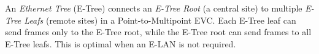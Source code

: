 \documentclass[12pt]{article}
\begin{document}
	An \textit{Ethernet Tree} (E-Tree) connects an \textit{E-Tree Root} (a central site) to multiple \textit{E-Tree Leafs} (remote sites) in a Point-to-Multipoint EVC. Each E-Tree leaf can send frames only to the E-Tree root, while the E-Tree root can send frames to all E-Tree leafs. This is optimal when an E-LAN is not required.





%
%
%
%
\end{document}

